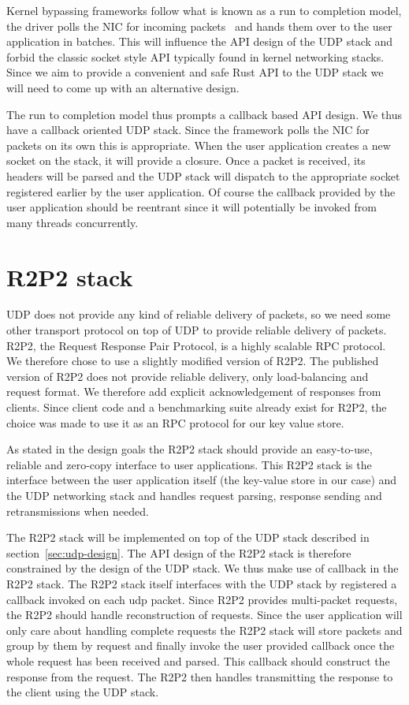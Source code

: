 \documentclass[11pt]{book}
\begin{document}
Kernel bypassing frameworks follow what is known as a run to
completion model, the driver polls the NIC for incoming
packets~\cite{dpdk-pmd} and hands them over to the user application in
batches. This will influence the API design of the UDP stack and
forbid the classic socket style API typically found in kernel
networking stacks. Since we aim to provide a convenient and safe Rust
API to the UDP stack we will need to come up with an alternative
design.

The run to completion model thus prompts a callback based API
design. We thus have a callback oriented UDP stack. Since the
framework polls the NIC for packets on its own this is
appropriate. When the user application creates a new socket on the
stack, it will provide a closure. Once a packet is received, its
headers will be parsed and the UDP stack will dispatch to the
appropriate socket registered earlier by the user application. Of
course the callback provided by the user application should be
reentrant since it will potentially be invoked from many threads
concurrently.

\section{R2P2 stack}

UDP does not provide any kind of reliable delivery of packets, so we
need some other transport protocol on top of UDP to provide reliable
delivery of packets. R2P2, the Request Response Pair Protocol, is a
highly scalable RPC protocol. We therefore chose to use a slightly
modified version of R2P2. The published version of R2P2 does not
provide reliable delivery, only load-balancing and request format. We
therefore add explicit acknowledgement of responses from
clients. Since client code and a benchmarking suite  already exist for
R2P2, the choice was made to use it as an RPC protocol for our key
value store.

As stated in the design goals the R2P2 stack should provide an
easy-to-use, reliable and zero-copy interface to user
applications. This R2P2 stack is the interface between the user
application itself (the key-value store in our case) and the UDP
networking stack and handles request parsing, response sending and
retransmissions when needed.

The R2P2 stack will be implemented on top of the UDP stack described in
section~\ref{sec:udp-design}. The API design of the R2P2 stack is
therefore constrained by the design of the UDP stack. We thus make use
of callback in the R2P2 stack. The R2P2 stack itself interfaces with
the UDP stack by registered a callback invoked on each udp
packet. Since R2P2 provides multi-packet requests, the R2P2 should
handle reconstruction of requests. Since the user application will
only care about handling complete requests the R2P2 stack will store
packets and group by them by request and finally invoke the user
provided callback once the whole request has been received and
parsed. This callback should construct the response from the
request. The R2P2 then handles transmitting the response to the client
using the UDP stack.
\end{document}
